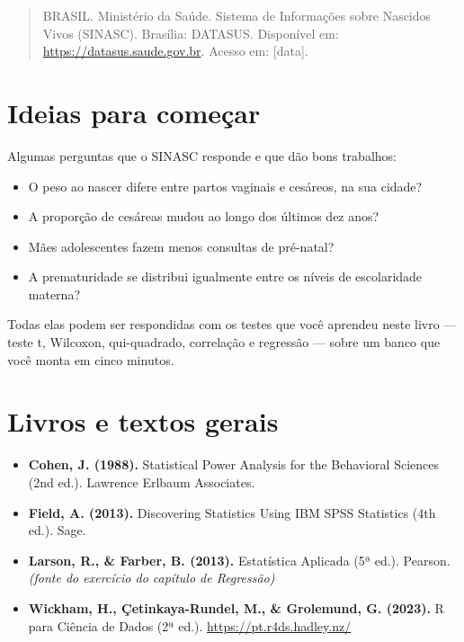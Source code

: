 \documentclass[
]{book}
\providecommand{\tightlist}{%
  \setlength{\itemsep}{0pt}\setlength{\parskip}{0pt}}
\begin{document}
\begin{quote}
BRASIL. Ministério da Saúde. Sistema de Informações sobre Nascidos Vivos (SINASC). Brasília: DATASUS. Disponível em: \url{https://datasus.saude.gov.br}. Acesso em: {[}data{]}.
\end{quote}

\section{Ideias para começar}\label{ideias-para-comeuxe7ar}

Algumas perguntas que o SINASC responde e que dão bons trabalhos:

\begin{itemize}
\tightlist
\item
  O peso ao nascer difere entre partos vaginais e cesáreos, na sua cidade?
\item
  A proporção de cesáreas mudou ao longo dos últimos dez anos?
\item
  Mães adolescentes fazem menos consultas de pré-natal?
\item
  A prematuridade se distribui igualmente entre os níveis de escolaridade materna?
\end{itemize}

Todas elas podem ser respondidas com os testes que você aprendeu neste livro --- teste t, Wilcoxon, qui-quadrado, correlação e regressão --- sobre um banco que você monta em cinco minutos.

\section*{Livros e textos gerais}\label{livros-e-textos-gerais}

\begin{itemize}
\item
  \textbf{Cohen, J. (1988).} Statistical Power Analysis for the Behavioral Sciences (2nd ed.). Lawrence Erlbaum Associates.
\item
  \textbf{Field, A. (2013).} Discovering Statistics Using IBM SPSS Statistics (4th ed.). Sage.
\item
  \textbf{Larson, R., \& Farber, B. (2013).} Estatística Aplicada (5ª ed.). Pearson. \emph{(fonte do exercício do capítulo de Regressão)}
\item
  \textbf{Wickham, H., Çetinkaya-Rundel, M., \& Grolemund, G. (2023).} R para Ciência de Dados (2ª ed.). \url{https://pt.r4ds.hadley.nz/}
\end{itemize}
\end{document}
